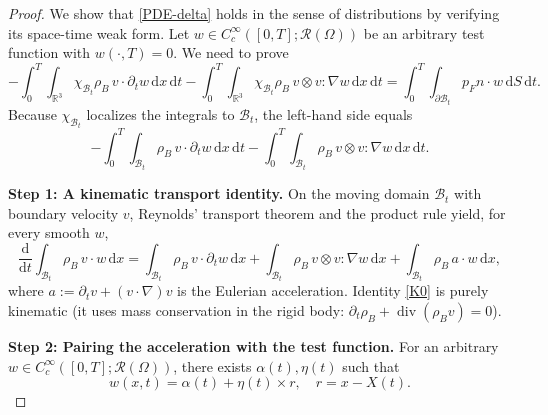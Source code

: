 \documentclass[11pt,twoside,reqno]{amsart}
\numberwithin{equation}{section}
\numberwithin{figure}{section}
\begin{document}
\begin{proof}
We show that \eqref{PDE-delta} holds in the sense of distributions by verifying its space-time weak
form. Let $w\in C_c^\infty([0,T];\mathcal{R}(\Omega))$ be an arbitrary test function with
$w(\cdot,T)=0$. We need to prove
\begin{equation}
-\!\!\int_0^T\!\!\int_{\mathbb R^3} \chi_{\mathcal{B}_t}\rho_B\,v\cdot\partial_tw\,\mathrm{d}x\,\mathrm{d}t
-\!\!\int_0^T\!\!\int_{\mathbb R^3} \chi_{\mathcal{B}_t}\rho_B\,v\otimes v:\nabla w\,\mathrm{d}x\,\mathrm{d}t
=\int_0^T\!\!\int_{\partial\mathcal{B}_t} p_Fn\cdot w\,\mathrm{d}S\,\mathrm{d}t.
\label{weak}
\end{equation}
Because $\chi_{\mathcal{B}_t}$ localizes the integrals to $\mathcal B_t$, the left-hand side equals
\begin{equation}
-\!\!\int_0^T\!\!\int_{\mathcal B_t} \rho_B\,v\cdot\partial_t w\,\mathrm{d}x\,\mathrm{d}t
-\!\!\int_0^T\!\!\int_{\mathcal B_t} \rho_B\, v\otimes v:\nabla w\,\mathrm{d}x\,\mathrm{d}t.
\label{LHS}
\end{equation}

\noindent\textbf{Step 1: A kinematic transport identity.}
On the moving domain $\mathcal B_t$ with boundary velocity $v$, Reynolds' transport theorem
and the product rule yield, for every smooth $w$,
\begin{equation}
\frac{\mathrm{d}}{\mathrm{d}t}\int_{\mathcal B_t}\rho_B\,v\cdot w\,\mathrm{d}x
=\int_{\mathcal B_t}\rho_B\, v\cdot\partial_t w\,\mathrm{d}x
+\int_{\mathcal B_t}\rho_B\, v\otimes v:\nabla w\,\mathrm{d}x
+\int_{\mathcal B_t}\rho_B\, a\cdot w\,\mathrm{d}x,
\label{K0}
\end{equation}
where $ a:=\partial_t v+(v\!\cdot\!\nabla) v$ is the Eulerian acceleration.
Identity \eqref{K0} is purely kinematic (it uses mass conservation in the rigid body:
$\partial_t\rho_B+\operatorname{div}(\rho_B v)=0$).

\noindent\textbf{Step 2: Pairing the acceleration with the test function.}
For an arbitrary $w\in C_c^\infty([0,T];\mathcal{R}(\Omega))$, there exists $\alpha(t), \eta(t)$ such that 
\begin{equation}\label{proj}
   w(x,t)=\alpha(t)+\eta(t)\times r,\quad r=x-X(t). 
\end{equation}




\end{proof}
\end{document}
